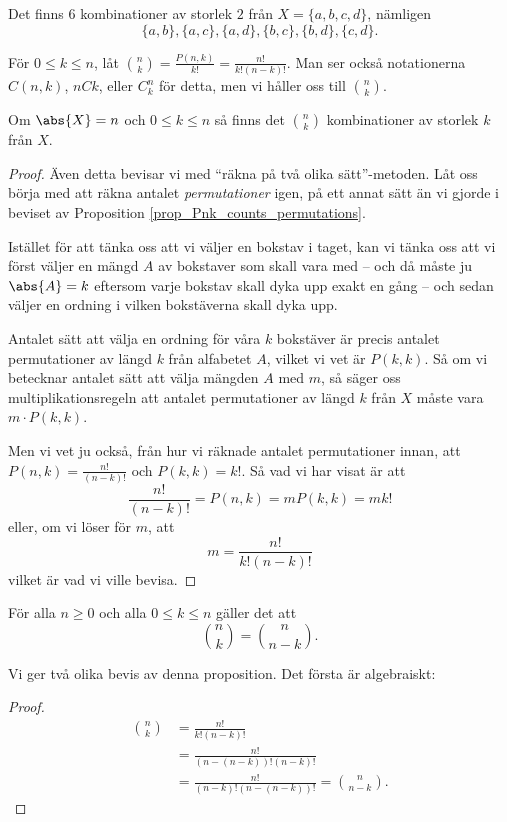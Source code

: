 \documentclass{tufte-handout}
\begin{document}
\begin{example}
	Det finns $6$ kombinationer av storlek $2$ från $X = \{a,b,c,d\}$, nämligen
	$$\{a,b\}, \{a,c\},\{a,d\},\{b,c\},\{b,d\},\{c,d\}.$$
\end{example}

\begin{definition}
	För $0 \leq k \leq n$, låt $\binom{n}{k} = \frac{P(n,k)}{k!} = \frac{n!}{k!(n-k)!}$. Man ser också notationerna $C(n,k)$, $nCk$, eller $C^n_k$ för detta, men vi håller oss till $\binom{n}{k}$. 
\end{definition}

\begin{proposition}
	Om $\abs{X} = n$ och $0 \leq k \leq n$ så finns det $\binom{n}{k}$ kombinationer av storlek $k$ från $X$.
	\begin{proof}
		Även detta bevisar vi med ``räkna på två olika sätt''-metoden. Låt oss börja med att räkna antalet \emph{permutationer} igen, på ett annat sätt än vi gjorde i beviset av Proposition \ref{prop_Pnk_counts_permutations}.

		Istället för att tänka oss att vi väljer en bokstav i taget, kan vi tänka oss att vi först väljer en mängd $A$ av bokstaver som skall vara med -- och då måste ju $\abs{A} = k$ eftersom varje bokstav skall dyka upp exakt en gång -- och sedan väljer en ordning i vilken bokstäverna skall dyka upp.

		Antalet sätt att välja en ordning för våra $k$ bokstäver är precis antalet permutationer av längd $k$ från alfabetet $A$, vilket vi vet är $P(k,k)$. Så om vi betecknar antalet sätt att välja mängden $A$ med $m$, så säger oss multiplikationsregeln att antalet permutationer av längd $k$ från $X$ måste vara $m\cdot P(k,k)$.

		Men vi vet ju också, från hur vi räknade antalet permutationer innan, att $P(n,k) = \frac{n!}{(n-k)!}$ och $P(k,k) = k!$. Så vad vi har visat är att
		$$\frac{n!}{(n-k)!} = P(n,k) = m P(k,k) = m k!$$
		eller, om vi löser för $m$, att
		$$m = \frac{n!}{k!(n-k)!}$$
		vilket är vad vi ville bevisa.
	\end{proof}
\end{proposition}

\begin{proposition}
	För alla $n \geq 0$ och alla $0 \leq k \leq n$ gäller det att
	$$\binom{n}{k} = \binom{n}{n-k}.$$
\end{proposition}

Vi ger två olika bevis av denna proposition. Det första är algebraiskt:
\begin{proof}
	\begin{align*}
		\binom{n}{k} &= \frac{n!}{k!(n-k)!}\\
		&= \frac{n!}{(n-(n-k))!(n-k)!}\\
		&= \frac{n!}{(n-k)!(n-(n-k))!} = \binom{n}{n-k}.
	\end{align*}
\end{proof}
\end{document}
